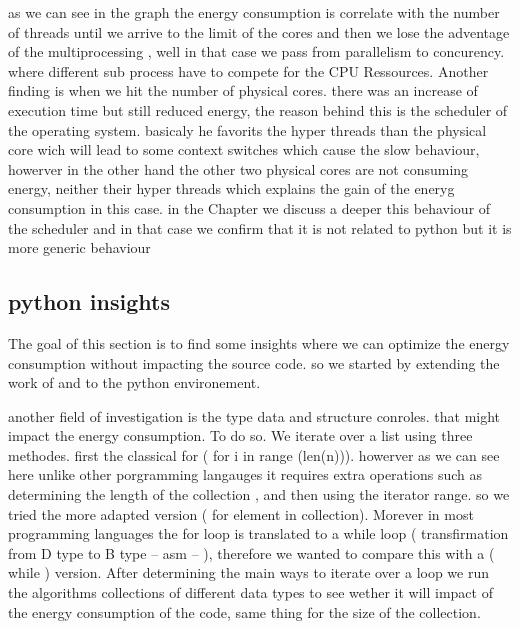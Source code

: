as we can see in the graph the energy consumption is correlate with the number of threads until we arrive to the limit of the cores and then we lose the adventage of the multiprocessing , well in that case we pass from parallelism to concurency. where different sub process have to compete for the CPU Ressources.
Another finding is when we hit the number of physical cores. there was an increase of execution time but still reduced energy, the reason behind this is the scheduler of the operating system. basicaly he favorits the hyper threads than the physical core wich will lead to some context switches which cause the slow behaviour, howerver in the other hand the other two physical cores are not consuming energy, neither their hyper threads which explains the gain of the eneryg consumption in this case.
in the Chapter %
we discuss a deeper this behaviour of the scheduler and in that case we confirm that it is not related to python but it is more generic behaviour %


\subsection{python insights}

The goal of this section is to find some insights where we can optimize the energy consumption without impacting the source code. so we started by extending the work of \citeauthor{hasan_energy_2016} and \citeauthor{oliveira_recommending_nodate} to the python environement.






another field of investigation is the type data and structure conroles. that might impact the energy consumption.
To do so. We iterate over a list using three methodes.
first the classical for ( for i in range (len(n))). howerver as we can see here unlike other porgramming langauges it requires extra operations such as determining the length of the collection , and then using the iterator range. so we tried the more adapted version
( for element in collection). Morever in most programming languages the for loop is translated to a while loop ( transfirmation from D type to B type -- asm -- ), therefore we wanted to compare this with a ( while ) version.
After determining the main ways to iterate over a loop we run the algorithms  collections of different data types to see wether it will impact of the energy consumption of the code, same thing for the size of the collection.

